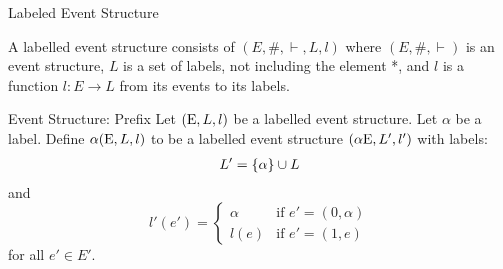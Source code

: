 \begin{frame}{Labeled Event Structure}
    \begin{definition}
        A labelled event structure consists of $(E,\#,\vdash,L,l)$ where
        $(E,\#,\vdash)$ is an event structure, $L$ is a set of labels,
        not including the element *, and $l$ is a function $l: E \rightarrow L$
        from its events to its labels.
    \end{definition}
\end{frame}

\begin{frame}{Event Structure: Prefix}
    Let $(\mathrm{E},L,l)$ be a labelled event structure.
    Let $\alpha$ be a label.
    Define $\alpha(\mathrm{E},L,l)$ to be a labelled event structure
    $(\alpha \mathrm{E},L',l')$
    with labels:
    \begin{align*}
        L' = \{\alpha\} \cup L
    \end{align*}
    and
    $$
        l'(e') = \begin{cases}
            \alpha & \text{if } e' = (0,\alpha) \\
            l(e)   & \text{if } e' = (1,e)
        \end{cases}
    $$
    for all $e' \in E'$.
\end{frame}

